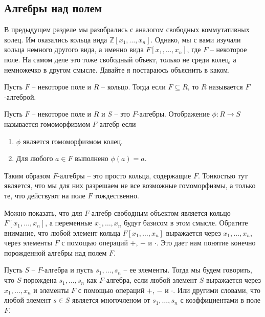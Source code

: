 \subsection{Алгебры над полем}

В предыдущем разделе мы разобрались с аналогом свободных коммутативных колец.
Им оказались кольца вида $\mathbb Z[x_1,\ldots,x_n]$.
Однако, мы с вами изучали кольца немного другого вида, а именно вида $F[x_1,\ldots,x_n]$, где $F$ -- некоторое поле.
На самом деле это тоже свободный объект, только не среди колец, а немножечко в другом смысле.
Давайте я постараюсь объяснить в каком.

\begin{definition}
Пусть $F$ -- некоторое поле и $R$ -- кольцо. Тогда если $F\subseteq R$, то $R$ называется $F$-алгеброй.
\end{definition}

\begin{definition}
Пусть $F$ -- некоторое поле и $R$ и $S$ -- это $F$-алгебры. Отображение $\phi\colon R\to S$ называется гомоморфизмом $F$-алгебр если
\begin{enumerate}
\item $\phi$ является гомоморфизмом колец.

\item Для любого $a\in F$ выполнено $\phi(a) = a$.
\end{enumerate}
\end{definition}

Таким образом $F$-алгебры -- это просто кольца, содержащие $F$.
Тонкостью тут является, что мы для них разрешаем не все возможные гомоморфизмы, а только те, что действуют на поле $F$ тождественно.

Можно показать, что для $F$-алгебр свободным объектом является кольцо $F[x_1,\ldots,x_n]$, а переменные $x_1,\ldots,x_n$ будут базисом в этом смысле.
Обратите внимание, что любой элемент кольца $F[x_1,\ldots,x_n]$ выражается через $x_1,\ldots,x_n$, через элементы $F$ с помощью операций $+$, $-$ и $\cdot$.
Это дает нам понятие конечно порожденной алгебры над полем $F$.

\begin{definition}
Пусть $S$ -- $F$-алгебра и пусть $s_1,\ldots,s_n$ -- ее элементы.
Тогда мы будем говорить, что $S$ порождена $s_1,\ldots, s_n$ как $F$-алгебра, если любой элемент $S$ выражается через $x_1,\ldots,x_n$ и элементы $F$ с помощью операций $+$, $-$ и $\cdot$.
Или другими словами, что любой элемент $s\in S$ является многочленом от $s_1,\ldots,s_n$ с коэффициентами в поле $F$.
\end{definition}

